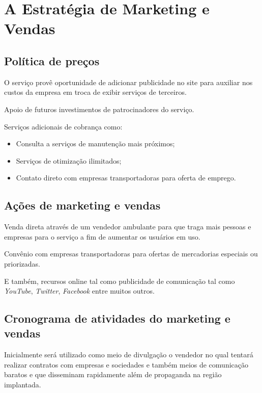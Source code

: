 \chapter{A Estratégia de Marketing e Vendas}
\label{cap:marketing}
	
	\section{Política de preços}
		O serviço provê oportunidade de adicionar publicidade no site para auxiliar nos custos da empresa em troca de exibir serviços de terceiros.
		
		Apoio de futuros investimentos de patrocinadores do serviço.
		
		Serviços adicionais de cobrança como:
		\begin{itemize}
			\item Consulta a serviços de manutenção mais próximos;
			\item Serviços de otimização ilimitados;
			\item Contato direto com empresas transportadoras para oferta de emprego.
		\end{itemize}
	
	\section{Ações de marketing e vendas}
		Venda direta através de um vendedor ambulante para que traga mais pessoas e empresas para o serviço a fim de aumentar os usuários em uso.
		
		Convênio com empresas transportadoras para ofertas de mercadorias especiais ou priorizadas.
		
		E também, recursos online tal como publicidade de comunicação tal como \textit{YouTube}, \textit{Twitter}, \textit{Facebook} entre muitos outros.
	
	\section{Cronograma de atividades do marketing e vendas}
		Inicialmente será utilizado como meio de divulgação o vendedor no qual tentará realizar contratos com empresas e sociedades e também meios de comunicação baratos e que disseminam rapidamente além de propaganda na região implantada.